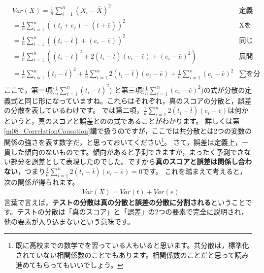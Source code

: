 \documentclass{ltjbook}
\begin{document}
\begin{align*}
	 & Var(X)  =  \frac{1}{n}\sum_{i=1}^n (X_i - \bar{X})^2                                                                                              & \mbox{定義より}         \\
	 & = \frac{1}{n}\sum_{i=1}^n  ((t_i + e_i) - (\bar{t} + \bar{e}))^2                                                                                  & \mbox{Xをテスト理論のモデルに} \\
	 & = \frac{1}{n}\sum_{i=1}^n (  (t_i - \bar{t}) + (e_i - \bar{e}) )^2                                                                                & \mbox{同じ記号でまとめる}    \\
	 & = \frac{1}{n}\sum_{i=1}^n (  (t_i - \bar{t})^2 + 2(t_i - \bar{t})(e_i - \bar{e}) + (e_i - \bar{e})^2  )                                           & \mbox{展開する}         \\
	 & = \frac{1}{n}\sum_{i=1}^n (t_i - \bar{t})^2 +\frac{1}{n}\sum_{i=1}^n 2(t_i - \bar{t})(e_i - \bar{e})  + \frac{1}{n}\sum_{i=1}^n (e_i - \bar{e})^2 & \mbox{$\sum$を分配}    \\
\end{align*}
ここで，第一項($\frac{1}{n}\sum_{i=1}^n (t_i - \bar{t})^2$) と第三項($\frac{1}{n}\sum_{i=1}^n (e_i - \bar{e})^2$)の式が分散の定義式と同じ形になっていますね。これらはそれぞれ，真のスコアの分散と，誤差の分散を表しているわけです。
では第二項，$\frac{1}{n}\sum_{i=1}^n 2(t_i - \bar{t})(e_i - \bar{e})$は何かというと，真のスコアと誤差とのの式であることがわかります。 詳しくは第\ref{m08_CorrelationCausation}講で扱うのですが，ここでは共分散とは2つの変数の関係の強さを表す数字だ，と思っておいてください\footnote{既に高校までの数学でを習っている人もいると思います。共分散は，標準化されていない相関係数のことでもあります。相関係数のことだと思って読み進めてもらってもいいでしょう。}。
さて，誤差は定義上，一貫した傾向のないものです。傾向があると予測できますが，まったく予測できない部分を誤差として表現したのでした。ですから\textbf{真のスコアと誤差は関係し合わない}，つまり$\frac{1}{n}\sum_{i=1}^n 2(t_i - \bar{t})(e_i - \bar{e})=0$です。
これを踏まえて考えると，次の関係が得られます。
\begin{align*}
	 & Var(X)= Var(t) + Var(e)
\end{align*}
言葉で言えば，\textbf{テストの分散は真の分散と誤差の分散に分割される}ということです。テストの分散は「真のスコア」と「誤差」の2つの要素で完全に説明され，他の要素が入り込まないという意味です。
\end{document}
